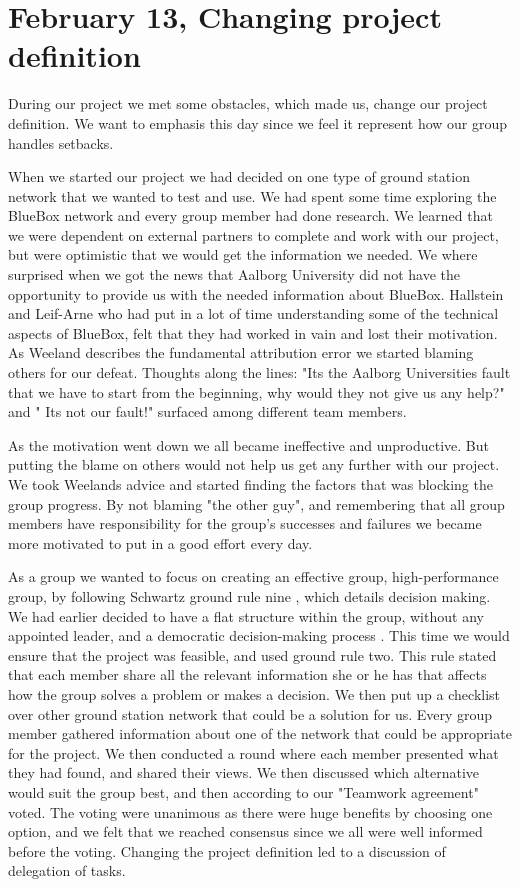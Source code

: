 \section{February 13, Changing project definition}

During our project we met some obstacles, which made us, change our project definition. We want to emphasis this day since we feel it represent how our group handles setbacks.

When we started our project we had decided on one type of ground station network that we wanted to test and use. We had spent some time exploring the BlueBox network and every group member had done research. We learned that we were dependent on external partners to complete and work with our project, but were optimistic that we would get the information we needed. We where surprised when we got the news that Aalborg University did not have the opportunity to provide us with the needed information about BlueBox. Hallstein and Leif-Arne who had put in a lot of time understanding some of the technical aspects of BlueBox, felt that they had worked in vain and lost their motivation. As Weeland describes the fundamental attribution error \cite{EffectiveTeamMembers} we started blaming others for our defeat. Thoughts along the lines: "Its the Aalborg Universities fault that we have to start from the beginning, why would they not give us any help?" and " Its not our fault!" surfaced among different team members. 

As the motivation went down we all became ineffective and unproductive. But putting the blame on others would not help us get any further with our project. We took Weelands advice and started finding the factors that was blocking the group progress. By not blaming "the other guy", and remembering that all group members have responsibility for the group's successes and failures we became more motivated to put in a good effort every day. 

As a group we wanted to focus on creating an effective group, high-performance group, by following Schwartz ground rule nine \cite{EffectiveGroups}, which details decision making. We had earlier decided to have a flat structure within the group, without any appointed leader, and a democratic decision-making process \cite{EffectiveGroups}. This time we would ensure that the project was feasible, and used ground rule two. This rule stated that each member share all the relevant information she or he has that affects how the group solves a problem or makes a decision. We then put up a checklist over other ground station network that could be a solution for us. Every group member gathered information about one of the network that could be appropriate for the project. We then conducted a round where each member presented what they had found, and shared their views. We then discussed which alternative would suit the group best, and then according to our "Teamwork agreement" voted. The voting were unanimous as there were huge benefits by choosing one option, and we felt that we reached consensus since we all were well informed before the voting. Changing the project definition led to a discussion of delegation of tasks. 

